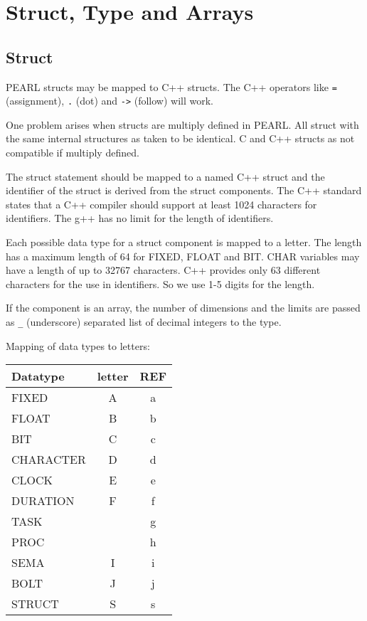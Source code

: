 \chapter{Struct, Type and Arrays}

\section{Struct}

PEARL structs may be mapped to C++ structs.
The C++ operators like \verb|=| (assignment), \verb|.| (dot) and 
\verb|->| (follow) will work.

One problem arises when structs are multiply defined
in PEARL. All struct with the same internal structures as
taken to be identical. C and C++ structs as not compatible
if multiply defined.

The struct statement should be mapped to a named C++ struct and the identifier
of the struct is derived from the struct components.
The C++ standard states that a C++ compiler should support at least 1024
characters for identifiers. The g++ has no limit for the length of identifiers.

Each possible data type for a struct component is mapped to a letter.
The length has a maximum length of 64 for FIXED, FLOAT and BIT. CHAR
variables may have a length of up to 32767 characters.
 C++ provides only 63 different
 characters for the use in identifiers. So we use 1-5 digits
for the length.

If the component is an array, the number of dimensions and the
 limits are
passed as \verb|_| (underscore) separated list of decimal integers
to the type.

Mapping of data types to letters:

\begin{tabular}{|l|c|c|}
\hline
Datatype & letter & REF \\
\hline
FIXED & A &a\\
FLOAT & B &b\\
BIT  & C &c\\
CHARACTER & D &d \\
CLOCK  & E &e \\
DURATION & F&f \\
TASK & & g \\
PROC  & & h \\
SEMA & I & i \\
BOLT & J & j \\
\hline
STRUCT & S &s\\
\hline
\end{tabular}

